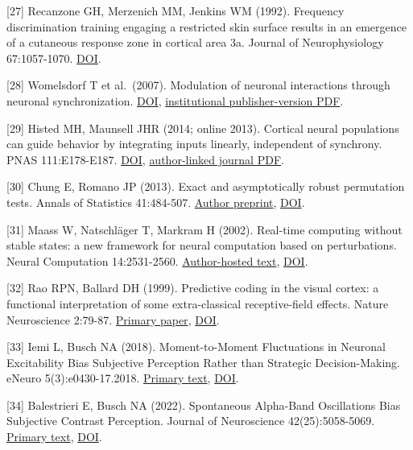 \documentclass[
  american,
  11pt,
  letterpaper,
]{article}
\begin{document}
{[}27{]} Recanzone GH, Merzenich MM, Jenkins WM (1992). Frequency discrimination training engaging a restricted skin surface results in an emergence of a cutaneous response zone in cortical area 3a. Journal of Neurophysiology 67:1057-1070. \href{https://doi.org/10.1152/jn.1992.67.5.1057}{DOI}.

{[}28{]} Womelsdorf T et al.~(2007). Modulation of neuronal interactions through neuronal synchronization. \href{https://doi.org/10.1126/science.1139597}{DOI}, \href{https://pure.mpg.de/rest/items/item_1566173_3/component/file_1566384/content}{institutional publisher-version PDF}.

{[}29{]} Histed MH, Maunsell JHR (2014; online 2013). Cortical neural populations can guide behavior by integrating inputs linearly, independent of synchrony. PNAS 111:E178-E187. \href{https://doi.org/10.1073/pnas.1318750111}{DOI}, \href{https://histed.squarespace.com/s/Cortical-neuronal-networks-can-integrate-inputs-linearly-independent-of-synchrony.pdf}{author-linked journal PDF}.

{[}30{]} Chung E, Romano JP (2013). Exact and asymptotically robust permutation tests. Annals of Statistics 41:484-507. \href{https://arxiv.org/abs/1304.5939}{Author preprint}, \href{https://doi.org/10.1214/13-AOS1090}{DOI}.

{[}31{]} Maass W, Natschläger T, Markram H (2002). Real-time computing without stable states: a new framework for neural computation based on perturbations. Neural Computation 14:2531-2560. \href{https://igi-web.tugraz.at/PDF/130.pdf}{Author-hosted text}, \href{https://doi.org/10.1162/089976602760407955}{DOI}.

{[}32{]} Rao RPN, Ballard DH (1999). Predictive coding in the visual cortex: a functional interpretation of some extra-classical receptive-field effects. Nature Neuroscience 2:79-87. \href{https://www.ni.cmu.edu/~tai/microns_papers/rao_ballard.pdf}{Primary paper}, \href{https://doi.org/10.1038/4580}{DOI}.

{[}33{]} Iemi L, Busch NA (2018). Moment-to-Moment Fluctuations in Neuronal Excitability Bias Subjective Perception Rather than Strategic Decision-Making. eNeuro 5(3):e0430-17.2018. \href{https://pure.mpg.de/rest/items/item_3066647_2/component/file_3066649/content?download=true}{Primary text}, \href{https://doi.org/10.1523/ENEURO.0430-17.2018}{DOI}.

{[}34{]} Balestrieri E, Busch NA (2022). Spontaneous Alpha-Band Oscillations Bias Subjective Contrast Perception. Journal of Neuroscience 42(25):5058-5069. \href{https://pmc.ncbi.nlm.nih.gov/articles/PMC9233438/}{Primary text}, \href{https://doi.org/10.1523/JNEUROSCI.1972-21.2022}{DOI}.
\end{document}
